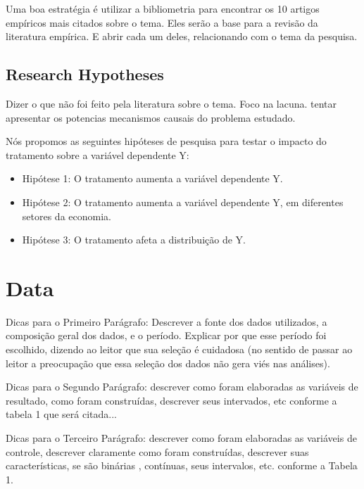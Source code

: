 \documentclass[a4paper]{article}
\begin{document}
Uma boa estratégia é utilizar a bibliometria para encontrar os 10 artigos empíricos mais citados sobre o tema. Eles serão a base para a revisão da literatura empírica. E abrir cada um deles, relacionando com o tema da pesquisa.

\subsection{Research Hypotheses}


Dizer o que não foi feito pela literatura sobre o tema. Foco na lacuna. tentar apresentar os potencias mecanismos causais do problema estudado.

Nós propomos as seguintes hipóteses de pesquisa para testar o impacto do tratamento sobre a variável dependente Y:

\begin{itemize}
      \item Hipótese 1: O tratamento aumenta a variável dependente Y.
      \item Hipótese 2: O tratamento aumenta a variável dependente Y, em diferentes setores da economia.
      \item Hipótese 3: O tratamento afeta a distribuição de Y.
\end{itemize}


\section{Data}
Dicas para o Primeiro Parágrafo: Descrever a fonte dos dados utilizados, a composição geral dos dados, e o período. Explicar por que esse período foi escolhido, dizendo ao leitor que sua seleção é cuidadosa (no sentido de passar ao leitor a preocupação que essa seleção dos dados não gera viés nas análises).

Dicas para o Segundo Parágrafo: descrever como foram elaboradas as variáveis de resultado, como foram construídas, descrever seus intervados, etc conforme a tabela 1 que será citada...

Dicas para o Terceiro Parágrafo: descrever como foram elaboradas as variáveis de controle, descrever claramente como foram construídas, descrever suas características, se são binárias , contínuas, seus intervalos, etc. conforme a Tabela 1.
\end{document}
